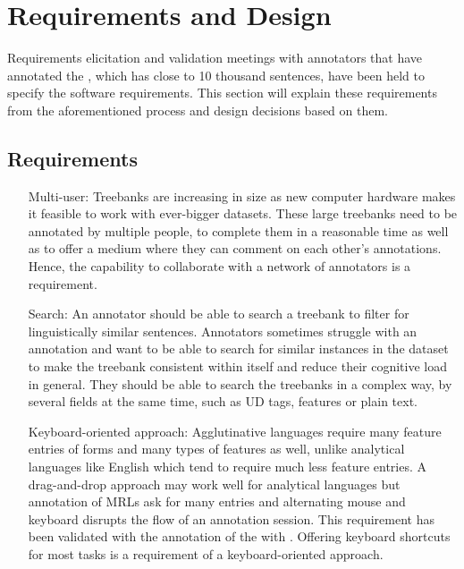 \section{Requirements and Design}
\label{sec:requirements}

Requirements elicitation and validation meetings with annotators that have annotated the \bountreebank{}, which has close to 10 thousand sentences, have been held to specify the software requirements.
This section will explain these requirements from the aforementioned process and design decisions based on them.

\subsection{Requirements}
\begin{itemize}[before=\normalfont, font=\itshape, align=left]
    \item[Multi-user:]
        Treebanks are increasing in size as new computer hardware makes it feasible to work with ever-bigger datasets.
        These large treebanks need to be annotated by multiple people, to complete them in a reasonable time as well as to offer a medium where they can comment on each other's annotations.
        Hence, the capability to collaborate with a network of annotators is a requirement.

    \item[Search:]
        An annotator should be able to search a treebank to filter for linguistically similar sentences.
        Annotators sometimes struggle with an annotation and want to be able to search for similar instances in the dataset to make the treebank consistent within itself and reduce their cognitive load in general.
        They should be able to search the treebanks in a complex way, by several fields at the same time, such as UD tags, features or plain text.

    \item[Keyboard-oriented approach:]
        Agglutinative languages require many feature entries of forms and many types of features as well, unlike analytical languages like English which tend to require much less feature entries.
        A drag-and-drop approach may work well for analytical languages but annotation of MRLs ask for many entries and alternating mouse and keyboard disrupts the flow of an annotation session.
        This requirement has been validated with the annotation of the \bountreebank with \boatvone.
        Offering keyboard shortcuts for most tasks is a requirement of a keyboard-oriented approach.


\end{itemize}
